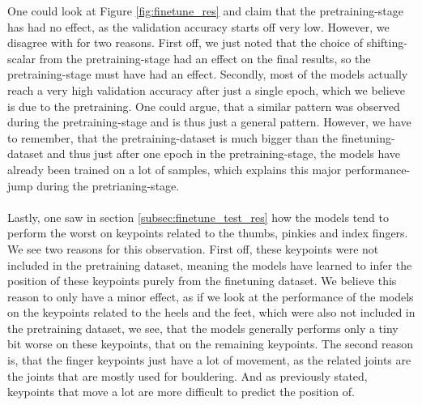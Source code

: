 \documentclass[./main.tex]{subfiles}
\begin{document}
One could look at Figure \ref{fig:finetune_res} and claim that the pretraining-stage has had no effect, as the validation accuracy starts off very low. However, we disagree with for two reasons. First off, we just noted that the choice of shifting-scalar from the pretraining-stage had an effect on the final results, so the pretraining-stage must have had an effect. Secondly, most of the models actually reach a very high validation accuracy after just a single epoch, which we believe is due to the pretraining. One could argue, that a similar pattern was observed during the pretraining-stage and is thus just a general pattern. However, we have to remember, that the pretraining-dataset is much bigger than the finetuning-dataset and thus just after one epoch in the pretraining-stage, the models have already been trained on a lot of samples, which explains this major performance-jump during the pretrianing-stage.
\\
\\
Lastly, one saw in section \ref{subsec:finetune_test_res} how the models tend to perform the worst on keypoints related to the thumbs, pinkies and index fingers. We see two reasons for this observation. First off, these keypoints were not included in the pretraining dataset, meaning the models have learned to infer the position of these keypoints purely from the finetuning dataset. We believe this reason to only have a minor effect, as if we look at the performance of the models on the keypoints related to the heels and the feet, which were also not included in the pretraining dataset, we see, that the models generally performs only a tiny bit worse on these keypoints, that on the remaining keypoints. The second reason is, that the finger keypoints just have a lot of movement, as the related joints are the joints that are mostly used for bouldering. And as previously stated, keypoints that move a lot are more difficult to predict the position of.
\end{document}
